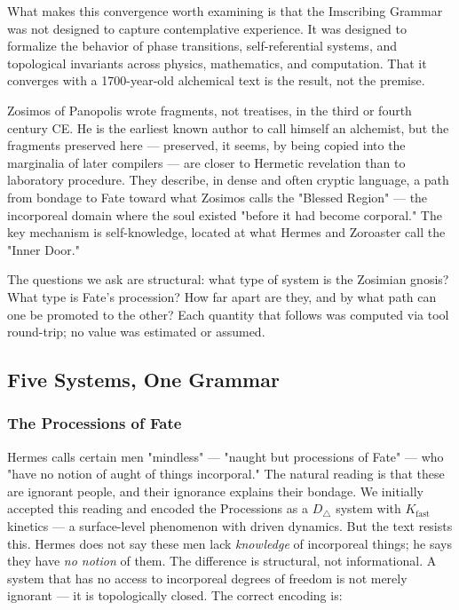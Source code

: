 \documentclass[12pt,a4paper]{article}
\begin{document}
What makes this convergence worth examining is that the Imscribing Grammar was not designed to capture contemplative experience. It was designed to formalize the behavior of phase transitions, self-referential systems, and topological invariants across physics, mathematics, and computation. That it converges with a 1700-year-old alchemical text is the result, not the premise.

Zosimos of Panopolis wrote fragments, not treatises, in the third or fourth century CE. He is the earliest known author to call himself an alchemist, but the fragments preserved here --- preserved, it seems, by being copied into the marginalia of later compilers --- are closer to Hermetic revelation than to laboratory procedure. They describe, in dense and often cryptic language, a path from bondage to Fate toward what Zosimos calls the "Blessed Region" --- the incorporeal domain where the soul existed "before it had become corporal." The key mechanism is self-knowledge, located at what Hermes and Zoroaster call the "Inner Door."

The questions we ask are structural: what type of system is the Zosimian gnosis? What type is Fate's procession? How far apart are they, and by what path can one be promoted to the other? Each quantity that follows was computed via tool round-trip; no value was estimated or assumed.

\subsection{Five Systems, One Grammar}

\subsubsection{The Processions of Fate}

Hermes calls certain men "mindless" --- "naught but processions of Fate" --- who "have no notion of aught of things incorporal." The natural reading is that these are ignorant people, and their ignorance explains their bondage. We initially accepted this reading and encoded the Processions as a $D_{\triangle}$ system with $K_\text{fast}$ kinetics --- a surface-level phenomenon with driven dynamics. But the text resists this. Hermes does not say these men lack \emph{knowledge} of incorporeal things; he says they have \emph{no notion} of them. The difference is structural, not informational. A system that has no access to incorporeal degrees of freedom is not merely ignorant --- it is topologically closed. The correct encoding is:
\end{document}
